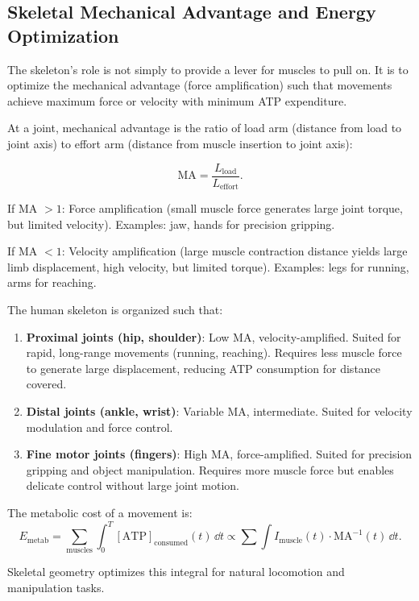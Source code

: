 \subsection{Skeletal Mechanical Advantage and Energy Optimization}
\label{subsec:skeletal-mechanics}

The skeleton's role is not simply to provide a lever for muscles to pull on. It is to optimize the mechanical advantage (force amplification) such that movements achieve maximum force or velocity with minimum ATP expenditure.

\begin{definition}
\label{def:mechanical-advantage}
At a joint, mechanical advantage is the ratio of load arm (distance from load to joint axis) to effort arm (distance from muscle insertion to joint axis):

\begin{equation}
  \text{MA} = \frac{L_{\text{load}}}{L_{\text{effort}}}.
\end{equation}

If MA $> 1$: Force amplification (small muscle force generates large joint torque, but limited velocity). Examples: jaw, hands for precision gripping.

If MA $< 1$: Velocity amplification (large muscle contraction distance yields large limb displacement, high velocity, but limited torque). Examples: legs for running, arms for reaching.
\end{definition}

\begin{theorem}
\label{thm:skeletal-optimization}
The human skeleton is organized such that:

\begin{enumerate}[label=(\roman*), noitemsep]
\item \textbf{Proximal joints (hip, shoulder)}: Low MA, velocity-amplified. Suited for rapid, long-range movements (running, reaching). Requires less muscle force to generate large displacement, reducing ATP consumption for distance covered.

\item \textbf{Distal joints (ankle, wrist)}: Variable MA, intermediate. Suited for velocity modulation and force control.

\item \textbf{Fine motor joints (fingers)}: High MA, force-amplified. Suited for precision gripping and object manipulation. Requires more muscle force but enables delicate control without large joint motion.
\end{enumerate}

The metabolic cost of a movement is:
\begin{equation}
  E_{\text{metab}} = \sum_{\text{muscles}} \int_0^T [\text{ATP}]_{\text{consumed}}(t) \, \dd t
  \propto \sum \int I_{\text{muscle}}(t) \cdot \text{MA}^{-1}(t) \, \dd t.
\end{equation}

Skeletal geometry optimizes this integral for natural locomotion and manipulation tasks.
\end{theorem}

